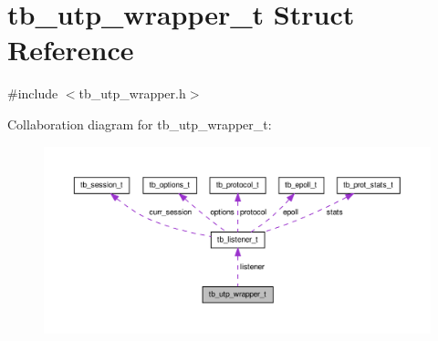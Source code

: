 \hypertarget{structtb__utp__wrapper__t}{\section{tb\-\_\-utp\-\_\-wrapper\-\_\-t Struct Reference}
\label{structtb__utp__wrapper__t}
}


{\ttfamily \#include $<$tb\-\_\-utp\-\_\-wrapper.\-h$>$}



Collaboration diagram for tb\-\_\-utp\-\_\-wrapper\-\_\-t\-:\nopagebreak
\begin{figure}[H]
\begin{center}
\leavevmode
\includegraphics[width=350pt]{structtb__utp__wrapper__t__coll__graph}
\end{center}
\end{figure}
